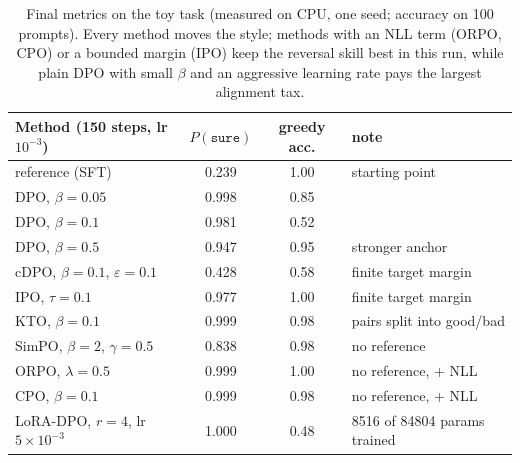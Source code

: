 \begin{table}[t]
\centering\small
\begin{tabular}{@{}lccl@{}}
\toprule
\textbf{Method (150 steps, lr $10^{-3}$)} & $P(\texttt{sure})$ & \textbf{greedy acc.} & \textbf{note}\\
\midrule
reference (SFT) & 0.239 & 1.00 & starting point\\
DPO, $\beta=0.05$ & 0.998 & 0.85 & \\
DPO, $\beta=0.1$ & 0.981 & 0.52 & \\
DPO, $\beta=0.5$ & 0.947 & 0.95 & stronger anchor\\
cDPO, $\beta=0.1$, $\varepsilon=0.1$ & 0.428 & 0.58 & finite target margin\\
IPO, $\tau=0.1$ & 0.977 & 1.00 & finite target margin\\
KTO, $\beta=0.1$ & 0.999 & 0.98 & pairs split into good/bad\\
SimPO, $\beta=2$, $\gamma=0.5$ & 0.838 & 0.98 & no reference\\
ORPO, $\lambda=0.5$ & 0.999 & 1.00 & no reference, + NLL\\
CPO, $\beta=0.1$ & 0.999 & 0.98 & no reference, + NLL\\
LoRA-DPO, $r=4$, lr $5\times10^{-3}$ & 1.000 & 0.48 & 8516 of 84804 params trained\\
\bottomrule
\end{tabular}
\caption{Final metrics on the toy task (measured on CPU, one seed; accuracy on 100 prompts). Every
method moves the style; methods with an NLL term (ORPO, CPO) or a bounded margin (IPO) keep the
reversal skill best in this run, while plain DPO with small $\beta$ and an aggressive learning rate
pays the largest alignment tax.}
\label{tab:dpo:toyresults}
\end{table}

